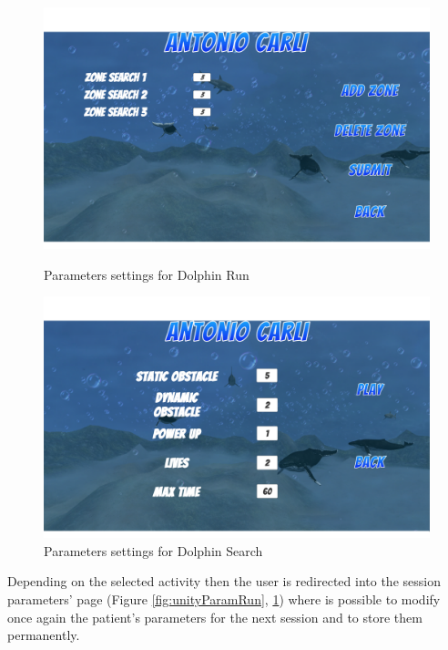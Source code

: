 \begin{figure}[h!]
	\centering
	\begin{minipage}[b]{0.49\textwidth}
		\includegraphics[width=\textwidth]{images/UX/unity/menu/5-search1}
		\caption{Parameters settings for Dolphin Run }
		\label{fig:unityParamRun}
	\end{minipage}
	\begin{minipage}[b]{0.49\textwidth}
		\includegraphics[width=\textwidth]{images/UX/unity/menu/8-runLevelParam}
		\caption{Parameters settings for Dolphin Search }
		\label{fig:unityParamSearch}
	\end{minipage}
\end{figure}

Depending on the selected activity then the user is redirected into the session parameters' page (Figure \ref{fig:unityParamRun}, \ref{fig:unityParamSearch}) where is possible to modify once again the patient's parameters for the next session and to store them permanently.
\pagebreak
